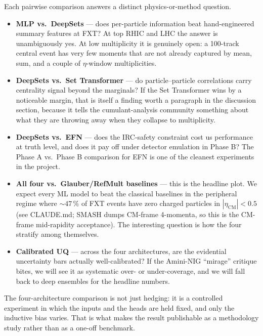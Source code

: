 \documentclass[11pt]{article}
\begin{document}
Each pairwise comparison answers a distinct physics-or-method
question.

\begin{itemize}[leftmargin=*]
\item \textbf{MLP vs.\ DeepSets} --- does per-particle information
      beat hand-engineered summary features at FXT? At top RHIC and
      LHC the answer is unambiguously yes. At low multiplicity it is
      genuinely open: a 100-track central event has very few moments
      that are not already captured by mean, sum, and a couple of
      $\eta$-window multiplicities.

\item \textbf{DeepSets vs.\ Set Transformer} --- do particle--particle
      correlations carry centrality signal beyond the marginals? If
      the Set Transformer wins by a noticeable margin, that is itself
      a finding worth a paragraph in the discussion section, because
      it tells the cumulant-analysis community something about what
      they are throwing away when they collapse to multiplicity.

\item \textbf{DeepSets vs.\ EFN} --- does the IRC-safety constraint
      cost us performance at truth level, and does it pay off under
      detector emulation in Phase B? The Phase A vs.\ Phase B
      comparison for EFN is one of the cleanest experiments in the
      project.

\item \textbf{All four vs.\ Glauber/RefMult baselines} --- this is the
      headline plot. We expect every ML model to beat the classical
      baselines in the peripheral regime where $\sim 47\,\%$ of FXT
      events have zero charged particles in $|\eta_{\text{CM}}|<0.5$
      (see CLAUDE.md; SMASH dumps CM-frame 4-momenta, so this is the
      CM-frame mid-rapidity acceptance). The interesting question is
      how the four
      stratify among themselves.

\item \textbf{Calibrated UQ} --- across the four architectures, are
      the evidential uncertainty bars actually well-calibrated? If the
      Amini-NIG ``mirage'' critique bites, we will see it as
      systematic over- or under-coverage, and we will fall back to
      deep ensembles for the headline numbers.
\end{itemize}

The four-architecture comparison is not just hedging: it is a
controlled experiment in which the inputs and the heads are held
fixed, and only the inductive bias varies. That is what makes the
result publishable as a methodology study rather than as a one-off
benchmark.
\end{document}

